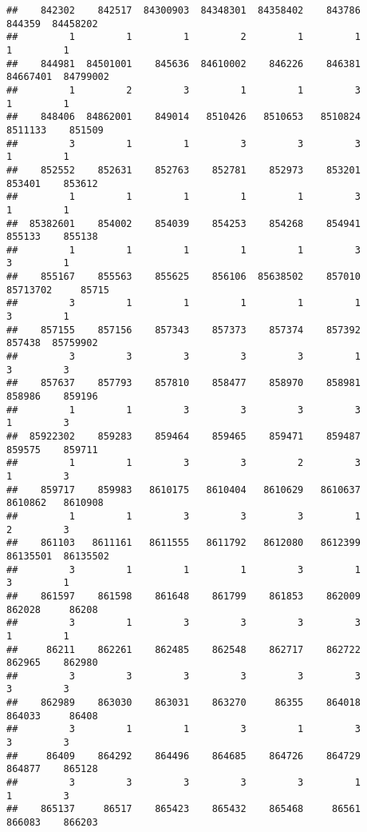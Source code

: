 \documentclass[
]{article}
\begin{document}
\begin{verbatim}
##    842302    842517  84300903  84348301  84358402    843786    844359  84458202 
##         1         1         1         2         1         1         1         1 
##    844981  84501001    845636  84610002    846226    846381  84667401  84799002 
##         1         2         3         1         1         3         1         1 
##    848406  84862001    849014   8510426   8510653   8510824   8511133    851509 
##         3         1         1         3         3         3         1         1 
##    852552    852631    852763    852781    852973    853201    853401    853612 
##         1         1         1         1         1         3         1         1 
##  85382601    854002    854039    854253    854268    854941    855133    855138 
##         1         1         1         1         1         3         3         1 
##    855167    855563    855625    856106  85638502    857010  85713702     85715 
##         3         1         1         1         1         1         3         1 
##    857155    857156    857343    857373    857374    857392    857438  85759902 
##         3         3         3         3         3         1         3         3 
##    857637    857793    857810    858477    858970    858981    858986    859196 
##         1         1         3         3         3         3         1         3 
##  85922302    859283    859464    859465    859471    859487    859575    859711 
##         1         1         3         3         2         3         1         3 
##    859717    859983   8610175   8610404   8610629   8610637   8610862   8610908 
##         1         1         3         3         3         1         2         3 
##    861103   8611161   8611555   8611792   8612080   8612399  86135501  86135502 
##         3         1         1         1         3         1         3         1 
##    861597    861598    861648    861799    861853    862009    862028     86208 
##         3         1         3         3         3         3         1         1 
##     86211    862261    862485    862548    862717    862722    862965    862980 
##         3         3         3         3         3         3         3         3 
##    862989    863030    863031    863270     86355    864018    864033     86408 
##         3         1         1         3         1         3         3         3 
##     86409    864292    864496    864685    864726    864729    864877    865128 
##         3         3         3         3         3         1         1         3 
##    865137     86517    865423    865432    865468     86561    866083    866203 

\end{verbatim}
\end{document}
